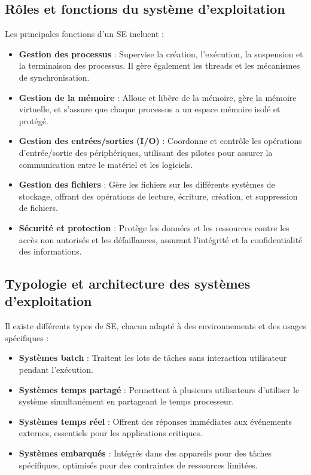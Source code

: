 \subsection{Rôles et fonctions du système d'exploitation}
Les principales fonctions d'un SE incluent :
\begin{itemize}
    \item \textbf{Gestion des processus} : Supervise la création, l'exécution, la suspension et la terminaison des processus. 
    Il gère également les threads et les mécanismes de synchronisation.
    \item \textbf{Gestion de la mémoire} : Alloue et libère de la mémoire, gère la mémoire virtuelle, et s'assure que chaque processus a un espace mémoire isolé et protégé.
    \item \textbf{Gestion des entrées/sorties (I/O)} : Coordonne et contrôle les opérations d'entrée/sortie des périphériques, utilisant des pilotes pour assurer la communication entre le matériel et les logiciels.
    \item \textbf{Gestion des fichiers} : Gère les fichiers sur les différents systèmes de stockage, offrant des opérations de lecture, écriture, création, et suppression de fichiers.
    \item \textbf{Sécurité et protection} : Protège les données et les ressources contre les accès non autorisés et les défaillances, assurant l'intégrité et la confidentialité des informations.
\end{itemize}

\subsection{Typologie et architecture des systèmes d'exploitation}
Il existe différents types de SE, chacun adapté à des environnements et des usages spécifiques :
\begin{itemize}
    \item \textbf{Systèmes batch} : Traitent les lots de tâches sans interaction utilisateur pendant l'exécution.
    \item \textbf{Systèmes temps partagé} : Permettent à plusieurs utilisateurs d'utiliser le système simultanément en partageant le temps processeur.
    \item \textbf{Systèmes temps réel} : Offrent des réponses immédiates aux événements externes, essentiels pour les applications critiques.
    \item \textbf{Systèmes embarqués} : Intégrés dans des appareils pour des tâches spécifiques, optimisés pour des contraintes de ressources limitées.
\end{itemize}


